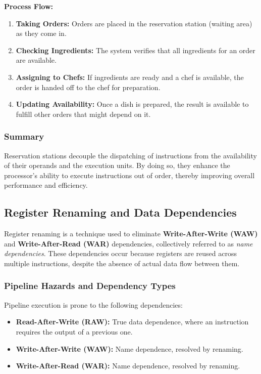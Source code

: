 \textbf{Process Flow:}
\begin{enumerate}
    \item \textbf{Taking Orders:} Orders are placed in the reservation station (waiting area) as they come in.
    \item \textbf{Checking Ingredients:} The system verifies that all ingredients for an order are available.
    \item \textbf{Assigning to Chefs:} If ingredients are ready and a chef is available, the order is handed off to the chef for preparation.
    \item \textbf{Updating Availability:} Once a dish is prepared, the result is available to fulfill other orders that might depend on it.
\end{enumerate}

\subsubsection{Summary}
Reservation stations decouple the dispatching of instructions from the availability of their operands and the execution units. By doing so, they enhance the processor's ability to execute instructions out of order, thereby improving overall performance and efficiency.

\subsection{Register Renaming and Data Dependencies}
Register renaming is a technique used to eliminate \textbf{Write-After-Write (WAW)} and \textbf{Write-After-Read (WAR)} dependencies, collectively referred to as \textit{name dependencies}. These dependencies occur because registers are reused across multiple instructions, despite the absence of actual data flow between them.

\subsubsection{Pipeline Hazards and Dependency Types}

Pipeline execution is prone to the following dependencies:
\begin{itemize}
    \item \textbf{Read-After-Write (RAW):} True data dependence, where an instruction requires the output of a previous one.
    \item \textbf{Write-After-Write (WAW):} Name dependence, resolved by renaming.
    \item \textbf{Write-After-Read (WAR):} Name dependence, resolved by renaming.
\end{itemize}

